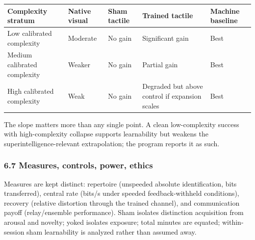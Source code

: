 \documentclass[
  11pt,
]{article}
\newcounter{none} %
\begin{document}
{\def\LTcaptype{none} %
\begin{longtable}[]{@{}
  >{\raggedright\arraybackslash}p{}
  >{\raggedright\arraybackslash}p{}
  >{\raggedright\arraybackslash}p{}
  >{\raggedright\arraybackslash}p{}
  >{\raggedright\arraybackslash}p{}@{}}
\toprule\noalign{}
\begin{minipage}[b]{\linewidth}\raggedright
Complexity stratum
\end{minipage} &
\begin{minipage}[b]{\linewidth}\raggedright
Native visual
\end{minipage} &
\begin{minipage}[b]{\linewidth}\raggedright
Sham tactile
\end{minipage} &
\begin{minipage}[b]{\linewidth}\raggedright
Trained tactile
\end{minipage} &
\begin{minipage}[b]{\linewidth}\raggedright
Machine baseline
\end{minipage} \\
\midrule\noalign{}
\endhead
\bottomrule\noalign{}
\endlastfoot
Low calibrated complexity & Moderate & No gain &
Significant gain & Best \\
Medium calibrated complexity & Weaker & No gain &
Partial gain & Best \\
High calibrated complexity & Weak & No gain & Degraded
but above control if expansion scales & Best \\
\end{longtable}
}

The slope matters more than any single point. A clean
low-complexity success with high-complexity collapse
supports learnability but weakens the
superintelligence-relevant extrapolation; the program
reports it as such.

\subsubsection{6.7 Measures, controls, power,
ethics}\label{measures-controls-power-ethics}

Measures are kept distinct: repertoire (unspeeded
absolute identification, bits transferred), central
rate (bits/s under speeded feedback-withheld
conditions), recovery (relative distortion through the
trained channel), and communication payoff
(relay/ensemble performance). Sham isolates distinction
acquisition from arousal and novelty; yoked isolates
exposure; total minutes are equated; within-session
sham learnability is analyzed rather than assumed away.
\end{document}

